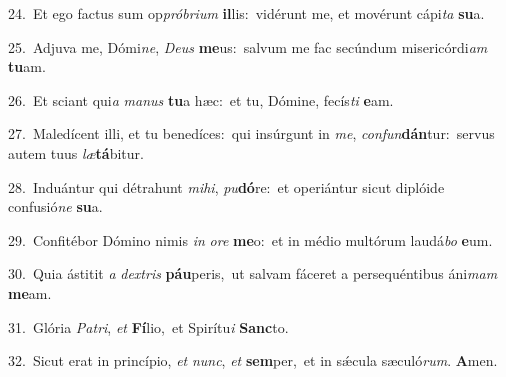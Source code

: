 {\numbfont\textcolor{\numbcolor}{24.}}~Et ego factus sum op\-\textit{pró}\-\textit{bri}\textit{um} \textbf{il}\-lis:~\star vidérunt me, et movérunt cápi\textit{ta} \textbf{su}\-a.\par
{\numbfont\textcolor{\numbcolor}{25.}}~Adjuva me, Dómi\-\textit{ne}\-, \textit{De}\-\textit{us} \textbf{me}\-us:~\star salvum me fac secúndum misericórdi\textit{am} \textbf{tu}\-am.\par
{\numbfont\textcolor{\numbcolor}{26.}}~Et sciant qui\textit{a} \textit{ma}\-\textit{nus} \textbf{tu}\-a hæc:~\star et tu, Dómine, fecís\textit{ti} \textbf{e}\-am.\par
{\numbfont\textcolor{\numbcolor}{27.}}~Maledícent illi, et tu benedíces:~\dagger qui insúrgunt in \textit{me}\-, \textit{con}\-\textit{fun}\textbf{dán}tur:~\star servus autem tuus \textit{læ}\-\textbf{tá}bitur.\par
{\numbfont\textcolor{\numbcolor}{28.}}~Induántur qui détrahunt \textit{mi}\-\textit{hi}, \textit{pu}\-\textbf{dó}re:~\star et operiántur sicut diplóide confusió\textit{ne} \textbf{su}\-a.\par
{\numbfont\textcolor{\numbcolor}{29.}}~Confitébor Dómino nimis \textit{in} \textit{o}\-\textit{re} \textbf{me}\-o:~\star et in médio multórum laudá\textit{bo} \textbf{e}\-um.\par
{\numbfont\textcolor{\numbcolor}{30.}}~Quia ástitit \textit{a} \textit{dex}\-\textit{tris} \textbf{páu}\-peris,~\star ut salvam fáceret a persequéntibus áni\textit{mam} \textbf{me}\-am.\par
{\numbfont\textcolor{\numbcolor}{31.}}~Glória \textit{Pa}\-\textit{tri}, \textit{et} \textbf{Fí}\-lio,~\star et Spirítu\textit{i} \textbf{Sanc}\-to.\par
{\numbfont\textcolor{\numbcolor}{32.}}~Sicut erat in princípio, \textit{et} \textit{nunc}\-, \textit{et} \textbf{sem}\-per,~\star et in sǽcula sæculó\-\textit{rum}\-. \textbf{A}\-men.\par
